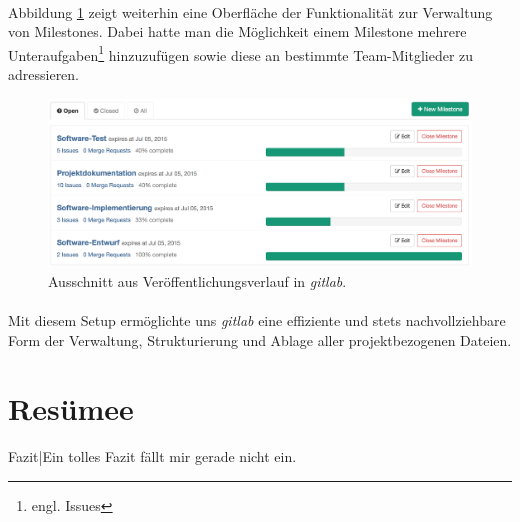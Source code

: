 \newpage
\paragraph{}Abbildung \ref{gl_milestone} zeigt weiterhin eine Oberfläche der Funktionalität zur Verwaltung von Milestones. Dabei hatte man die Möglichkeit einem Milestone mehrere Unteraufgaben\footnote{engl. Issues} hinzuzufügen sowie diese an bestimmte Team-Mitglieder zu adressieren.

\hspace*{1cm}
\begin{figure}[h!]
	\centering
	\includegraphics[width=\textwidth]{images/gl_milestones.png}
	\caption{Ausschnitt aus Veröffentlichungsverlauf in \textit{gitlab}.}
	\label{gl_milestone}
\end{figure}

\paragraph{}Mit diesem Setup ermöglichte uns \textit{gitlab} eine effiziente und stets nachvollziehbare Form der Verwaltung, Strukturierung und Ablage aller projektbezogenen Dateien.

\newpage
\section{Resümee}
Fazit\todo|{Ein tolles Fazit fällt mir gerade nicht ein.}



